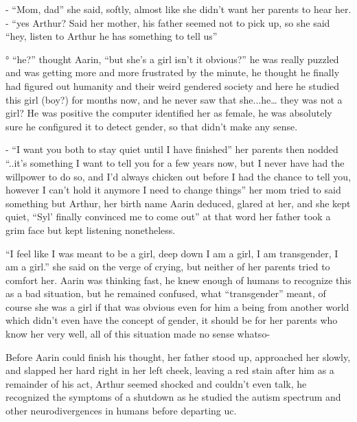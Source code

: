\documentclass[hidelinks,12pt,a4paper]{book}
\begin{document}
- “Mom, dad” she said, softly, almost like she didn't want her parents to hear her.\newline
- “yes Arthur? Said her mother, his father seemed not to pick up, so she said
 “hey, listen to Arthur he has something to tell us”\newline

° “he?” thought Aarin, “but she's a girl isn't it obvious?” 
he was really puzzled and was getting more and more frustrated by the minute, 
he thought he finally had figured out humanity and their weird gendered society and 
here he studied this girl (boy?) for months now, and he never saw that she...he… 
they was not a girl? He was positive the computer identified her as female, he was absolutely sure 
he configured it to detect gender, so that didn't make any sense.\par
\bigskip

- “I want you both to stay quiet until I have finished” her parents then nodded 
“..it's something I want to tell you for a few years now, but I never have had the willpower to do so, 
and I'd always chicken out before I had the chance to tell you, however I can't hold it anymore I need to change things” 
her mom tried to said something but Arthur, her birth name Aarin deduced, glared at her, and she kept quiet, 
“Syl' finally convinced me to come out” at that word her father took a grim face but kept listening nonetheless.\newline

“I feel like I was meant to be a girl, deep down I am a girl, I am transgender, I am a girl.” she said on the verge of crying,
 but neither of her parents tried to comfort her. Aarin was thinking fast, 
 he knew enough of humans to recognize this as a bad situation, but he remained confused, what
  “transgender” meant, of course she was a girl if that was obvious even for him a being from another world which 
  didn't even have the concept of gender, it should be for her parents who know her very well, all of this situation 
  made no sense whatso-\par
  \bigskip

Before Aarin could finish his thought, her father stood up, approached her slowly, and slapped her 
hard right in her left cheek, leaving a red stain after him as a remainder of his act, 
Arthur seemed shocked and couldn't even talk, he recognized the symptoms of a shutdown as he studied the 
autism spectrum and other neurodivergences in humans before departing \gls{uc}. \par
\bigskip
\end{document}
